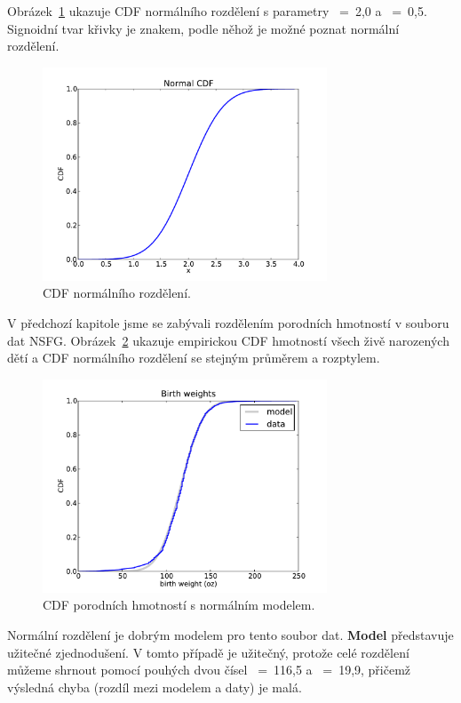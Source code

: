 \documentclass[12pt]{book}
\begin{document}
Obrázek~\ref{normal_cdf} ukazuje CDF normálního rozdělení s parametry \mymu~=~2,0 a \mysigma~=~0,5.  Signoidní tvar křivky je znakem, podle něhož je možné poznat normální rozdělení.

\begin{figure}
\centerline{\includegraphics[height=2.5in]{figs/normal_cdf.pdf}}
\caption{CDF normálního rozdělení.}
\label{normal_cdf}
\end{figure}

V předchozí kapitole jsme se zabývali rozdělením porodních hmotností v souboru dat NSFG.
Obrázek~\ref{nsfg_birthwgt_model} ukazuje empirickou
CDF hmotností všech živě narozených dětí a CDF normálního rozdělení se stejným průměrem a rozptylem.

\begin{figure}
\centerline{\includegraphics[height=2.5in]{figs/nsfg_birthwgt_model.pdf}}
\caption{CDF porodních hmotností s normálním modelem.}
\label{nsfg_birthwgt_model}
\end{figure}

Normální rozdělení je dobrým modelem pro tento soubor dat.  {\bf
 Model} představuje užitečné zjednodušení.  V tomto případě je užitečný, protože celé rozdělení můžeme shrnout pomocí pouhých dvou čísel \mymu~=~116,5 a \mysigma~=~19,9, přičemž výsledná chyba
(rozdíl mezi modelem a daty) je malá.
\end{document}
